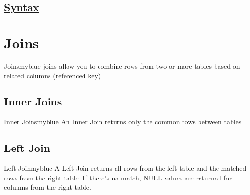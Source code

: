 \vspace{0.15cm}
\subsection*{\underline{Syntax}}


\vspace{0.35cm}
\section{Joins}
\begin{prettyBox}{Joins}{myblue}
joins allow you to combine rows from two or more tables based on related columns (referenced key)
\end{prettyBox}

\vspace{0.25cm}
\subsection{Inner Joins}
\begin{prettyBox}{Inner Joins}{myblue}
An Inner Join returns only the common rows between tables
\begin{center}
\end{center}
\end{prettyBox}

\vspace{0.25cm}
\subsection{Left Join}

\begin{prettyBox}{Left Join}{myblue}
A Left Join returns all rows from the left table and the matched rows from the right table. If there’s no match,
NULL values are returned for columns from the right table.

\begin{center}
\end{center}
\end{prettyBox}

